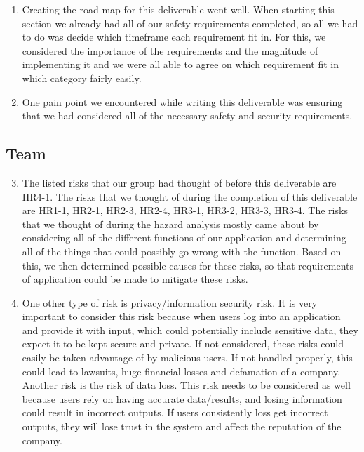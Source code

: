 \documentclass{article}
\begin{document}
\begin{enumerate}
    \item Creating the road map for this deliverable went well. When starting this section we already had all of our safety requirements completed, so all we had to do was decide which timeframe each requirement fit in. For this, we considered the importance of the requirements and the magnitude of implementing it and we were all able to agree on which requirement fit in which category fairly easily. 
    \item One pain point we encountered while writing this deliverable was ensuring that we had considered all of the necessary safety and security requirements. 
\end{enumerate}  

\subsection*{Team}

\begin{enumerate}
\setcounter{enumi}{2}
    \item The listed risks that our group had thought of before this deliverable are HR4-1. The risks that we thought of during the completion of this deliverable are HR1-1, HR2-1,  HR2-3, HR2-4, HR3-1, HR3-2, HR3-3, HR3-4. The risks that we thought of during the hazard analysis mostly came about by considering all of the different functions of our application and determining all of the things that could possibly go wrong with the function. Based on this, we then determined possible causes for these risks, so that requirements of application could be made to mitigate these risks.
    \item One other type of risk is privacy/information security risk. It is very important to consider this risk because when users log into an application and provide it with input, which could potentially include sensitive data, they expect it to be kept secure and private. If not considered, these risks could easily be taken advantage of by malicious users. If not handled properly, this could lead to lawsuits, huge financial losses and defamation of a company. Another risk is the risk of data loss. This risk needs to be considered as well because users rely on having accurate data/results, and losing information could result in incorrect outputs. If users consistently loss get incorrect outputs, they will lose trust in the system and affect the reputation of the company. 
\end{enumerate} 
\end{document}

